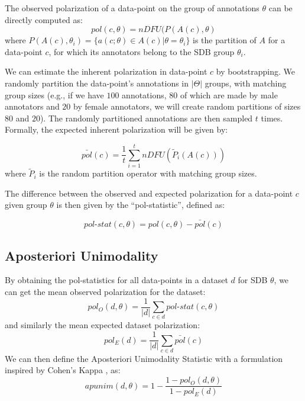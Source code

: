\documentclass{article}
\begin{document}
The observed polarization of a data-point on the group of annotations $\theta$ can be directly computed as: 
 \begin{equation}
 	pol(c, \theta) = nDFU(P(A(c), \theta)
 \end{equation}
 \noindent where $P(A(c), \theta_i) = \{a(c; \theta) \in A(c) | \theta=\theta_i\}$ is the partition of $A$ for a data-point $c$, for which its annotators belong to the \ac{SDB} group $\theta_i$.
 
 We can estimate the inherent polarization in data-point $c$ by bootstrapping. We randomly partition the data-point's annotations in $\lvert \Theta \rvert$ groups, with matching group sizes (e.g., if we have $100$ annotations, $80$ of which are made by male annotators and $20$ by female annotators, we will create random partitions of sizes $80$ and $20$). The randomly partitioned annotations are then sampled $t$ times. Formally, the expected inherent polarization will be given by:
 
 \begin{equation}
 	\label{eq:pol_expected}
 	\bar{pol}(c) = \frac{1}{t} \sum_{i=1}^t  \textit{nDFU}(\tilde{P}_i(A(c)))
 \end{equation}
 \noindent where $\tilde{P}_i$ is the random partition operator with matching group sizes.
 
 The difference between the observed and expected polarization for a data-point $c$ given group $\theta$ is then given by the ``pol-statistic'', defined as: 

 \begin{equation}
	\textit{pol-stat}(c, \theta)  = pol(c, \theta) - \bar{pol}(c)
\end{equation}


\subsection{Aposteriori Unimodality}
\label{ssec:methodology:aposteriori}

By obtaining the pol-statistics for all data-points in a dataset $d$ for \ac{SDB} $\theta$, we can get the mean observed polarization for the dataset:
\begin{equation}
	pol_{O}(d, \theta) = \frac{1}{\lvert d \rvert} \sum_{c \in d}\textit{pol-stat}(c, \theta)
\end{equation} 
\noindent and similarly the mean expected dataset polarization:
\begin{equation}
	pol_{E}(d) = \frac{1}{\lvert d \rvert} \sum_{c \in d}\bar{pol}(c)
\end{equation}
\noindent We can then define the Aposteriori Unimodality Statistic with a formulation inspired by Cohen's Kappa \cite{Cohen_1960}, as:
\begin{equation}
	apunim(d, \theta) = 1 - \frac{1 - pol_O(d, \theta)}{1 - pol_E(d)}
\end{equation}
\end{document}

